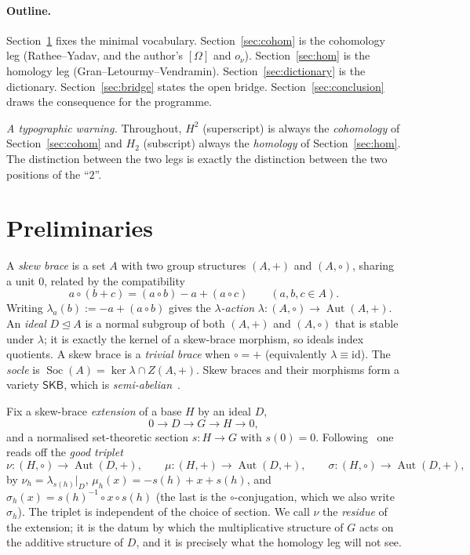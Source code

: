 \documentclass[11pt]{article}
\theoremstyle{definition}
\newcommand{\SKB}{\mathsf{SKB}}
\newcommand{\id}{\mathrm{id}}
\newcommand{\Aut}{\operatorname{Aut}}
\newcommand{\Soc}{\operatorname{Soc}}
\newcommand{\shat}{\widehat{\sigma}}
\begin{document}
\paragraph{Outline.}
Section~\ref{sec:prelim} fixes the minimal vocabulary. Section~\ref{sec:cohom} is the
cohomology leg (Rathee--Yadav, and the author's $[\Omega]$ and $o_\nu$).
Section~\ref{sec:hom} is the homology leg (Gran--Letourmy--Vendramin).
Section~\ref{sec:dictionary} is the dictionary. Section~\ref{sec:bridge} states the open
bridge. Section~\ref{sec:conclusion} draws the consequence for the programme.

\medskip
\noindent\emph{A typographic warning.} Throughout, $H^2$ (superscript) is always the
\emph{cohomology} of Section~\ref{sec:cohom} and $H_2$ (subscript) always the \emph{homology}
of Section~\ref{sec:hom}. The distinction between the two legs is exactly the distinction
between the two positions of the ``$2$''.

\section{Preliminaries}\label{sec:prelim}

A \emph{skew brace} is a set $A$ with two group structures $(A,+)$ and $(A,\circ)$, sharing
a unit $0$, related by the compatibility
\[
a\circ(b+c) = (a\circ b) - a + (a\circ c)\qquad(a,b,c\in A).
\]
Writing $\lambda_a(b) := -a + (a\circ b)$ gives the \emph{$\lambda$-action}
$\lambda\colon (A,\circ)\to\Aut(A,+)$. An \emph{ideal} $D\trianglelefteq A$ is a normal
subgroup of both $(A,+)$ and $(A,\circ)$ that is stable under $\lambda$; it is exactly the
kernel of a skew-brace morphism, so ideals index quotients. A skew brace is a \emph{trivial
brace} when $\circ=+$ (equivalently $\lambda\equiv\id$). The \emph{socle} is
$\Soc(A) = \ker\lambda\cap Z(A,+)$. Skew braces and their morphisms form a variety $\SKB$,
which is \emph{semi-abelian}~\cite{GLV}.

Fix a skew-brace \emph{extension} of a base $H$ by an ideal $D$,
\begin{equation}\label{eq:ext}
0 \longrightarrow D \longrightarrow G \longrightarrow H \longrightarrow 0 ,
\end{equation}
and a normalised set-theoretic section $s\colon H\to G$ with $s(0)=0$. Following~\cite{RY}
one reads off the \emph{good triplet}
\[
\nu\colon (H,\circ)\to\Aut(D,+),\qquad
\mu\colon (H,+)\to\Aut(D,+),\qquad
\sigma\colon (H,\circ)\to\Aut(D,+),
\]
by $\nu_h=\lambda_{s(h)}|_D$, $\mu_h(x)=-s(h)+x+s(h)$, and $\sigma_h(x)=s(h)^{-1}\circ x\circ s(h)$
(the last is the $\circ$-conjugation, which we also write $\shat_h$). The triplet is
independent of the choice of section. We call $\nu$ the \emph{residue} of the
extension; it is the datum by which the multiplicative structure of $G$ acts on the additive
structure of $D$, and it is precisely what the homology leg will not see.
\end{document}
